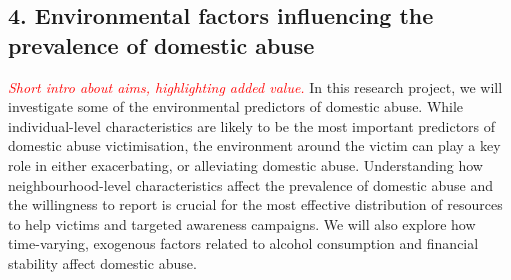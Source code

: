\documentclass[11pt, a4paper]{article}
\begin{document}
\subsection*{4. Environmental factors influencing the prevalence of domestic abuse}

\textcolor{red}{\textit{Short intro about aims, highlighting added value.}}
In this research project, we will investigate some of the environmental predictors of domestic abuse. While individual-level characteristics are likely to be the most important predictors of domestic abuse victimisation, the environment around the victim can play a key role in either exacerbating, or alleviating domestic abuse. Understanding how neighbourhood-level characteristics affect the prevalence of domestic abuse and the willingness to report is crucial for the most effective distribution of resources to help victims and targeted awareness campaigns. We will also explore how time-varying, exogenous factors related to alcohol consumption and financial stability affect domestic abuse. 


%
%
%
%
%
\end{document}
